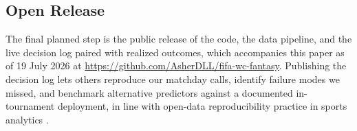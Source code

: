 \subsection{Open Release}
\label{sec:future-release}

The final planned step is the public release of the code, the data
pipeline, and the live decision log paired with realized outcomes,
which accompanies this paper as of 19 July 2026 at
\url{https://github.com/AsherDLL/fifa-wc-fantasy}. Publishing the decision
log lets others reproduce our matchday calls, identify failure modes
we missed, and benchmark alternative predictors against a documented
in-tournament deployment, in line with open-data reproducibility
practice in sports analytics \citep{eager2023football}.
